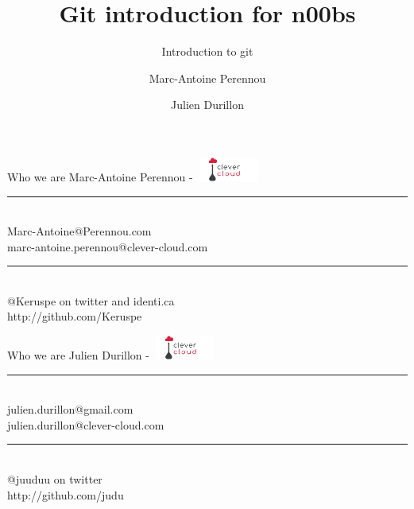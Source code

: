 \documentclass{beamer}
\title{Git introduction for n00bs}
\subtitle{Introduction to git}
\author[Keruspe \and Judu]{Marc-Antoine Perennou \and Julien Durillon}
\institute[CC]{Clever Cloud -- http://www.clever-cloud.com/}
\date{}
\begin{document}
\begin{frame}[plain]
    \titlepage
\end{frame}

\begin{frame}{Who we are}
      Marc-Antoine Perennou - \includegraphics[width=80px,height=30px]{logo-cc.png} \\[0.5cm]
      \hrule \hfill \\[0.5cm]
      Marc-Antoine@Perennou.com \\
      marc-antoine.perennou@clever-cloud.com \\[0.5cm]
      \hrule \hfill \\[0.5cm]
      @Keruspe on twitter and identi.ca \\
      http://github.com/Keruspe
\end{frame}
\begin{frame}{Who we are}
      Julien Durillon - \includegraphics[width=80px,height=30px]{logo-cc.png} \\[0.5cm]
      \hrule \hfill \\[0.5cm]
      julien.durillon@gmail.com \\
      julien.durillon@clever-cloud.com \\[0.5cm]
      \hrule \hfill \\[0.5cm]
      @juuduu on twitter \\
      http://github.com/judu
\end{frame}
\end{document}
